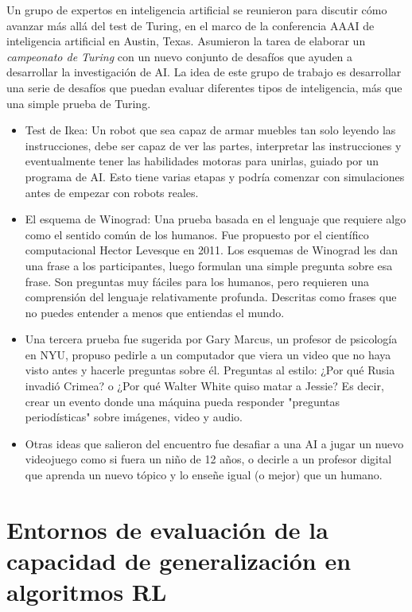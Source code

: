 Un grupo de expertos en inteligencia artificial se reunieron para discutir cómo avanzar más allá del test de Turing, en el marco de la conferencia AAAI de inteligencia artificial en Austin, Texas. Asumieron la tarea de elaborar un \textit{campeonato de Turing} con un nuevo conjunto de desafíos que ayuden a desarrollar la investigación de AI. La idea de este grupo de trabajo es desarrollar una serie de desafíos que puedan evaluar diferentes tipos de inteligencia, más que una simple prueba de Turing.
\begin{itemize}
    \item Test de Ikea: Un robot que sea capaz de armar muebles tan solo leyendo las instrucciones, debe ser capaz de ver las partes, interpretar las instrucciones y eventualmente tener las habilidades motoras para unirlas, guiado por un programa de AI. Esto tiene varias etapas y podría comenzar con simulaciones antes de empezar con robots reales.

    \item El esquema de Winograd: Una prueba basada en el lenguaje que requiere algo como el sentido común de los humanos. Fue propuesto por el científico computacional Hector Levesque en 2011. Los esquemas de Winograd les dan una frase a los participantes, luego formulan una simple pregunta sobre esa frase. Son preguntas muy fáciles para los humanos, pero requieren una comprensión del lenguaje relativamente profunda. Descritas como frases que no puedes entender a menos que entiendas el mundo.
    
    \item Una tercera prueba fue sugerida por Gary Marcus, un profesor de psicología en NYU, propuso pedirle a un computador que viera un video que no haya visto antes y hacerle preguntas sobre él. Preguntas al estilo: ¿Por qué Rusia invadió Crimea? o ¿Por qué Walter White quiso matar a Jessie? Es decir, crear un evento donde una máquina pueda responder "preguntas periodísticas" sobre imágenes, video y audio.

    \item Otras ideas que salieron del encuentro fue desafiar a una AI a jugar un nuevo videojuego como si fuera un niño de 12 años, o decirle a un profesor digital que aprenda un nuevo tópico y lo enseñe igual (o mejor) que un humano.
\end{itemize}

\section{Entornos de evaluación de la capacidad de generalización en algoritmos RL}\label{section:state-of-the-art:evaluation-enviroments-for-generalization-on-rl-algoritms}

